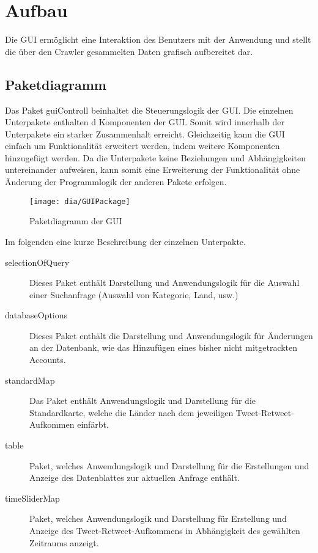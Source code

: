 \section{Aufbau}
Die GUI ermöglicht eine Interaktion des Benutzers mit der Anwendung und stellt die über den Crawler gesammelten Daten grafisch aufbereitet dar.\\
\subsection{Paketdiagramm}
Das Paket {guiControll} beinhaltet die Steuerungslogik der GUI. Die einzelnen Unterpakete enthalten d Komponenten der GUI. Somit wird innerhalb der Unterpakete ein starker Zusammenhalt erreicht. Gleichzeitig kann die GUI einfach um Funktionalität erweitert werden, indem weitere Komponenten hinzugefügt werden. Da die Unterpakete keine Beziehungen und Abhängigkeiten untereinander aufweisen, kann somit eine Erweiterung der Funktionalität ohne Änderung der Programmlogik der anderen Pakete erfolgen. 
\begin{figure}[h!]
	\centering
	\texttt{[image: dia/GUIPackage]}
	\caption{Paketdiagramm der GUI}
	\label{fig:GUI}
\end{figure}


Im folgenden eine kurze Beschreibung der einzelnen Unterpakte.
\begin{description}
		\item [selectionOfQuery] Dieses Paket enthält Darstellung und Anwendungslogik für die Auswahl einer Suchanfrage (Auswahl von Kategorie, Land, usw.)
		\item[databaseOptions] Dieses Paket enthält die Darstellung und Anwendungslogik für Änderungen an der Datenbank, wie das Hinzufügen eines bisher nicht mitgetrackten Accounts.
		
		\item [standardMap] Das Paket enthält Anwendungslogik und Darstellung für die Standardkarte, welche die Länder nach dem jeweiligen Tweet-Retweet-Aufkommen einfärbt.
		\item [table] Paket, welches Anwendungslogik und Darstellung für die Erstellungen und Anzeige des Datenblattes zur aktuellen Anfrage enthält.
		\item [timeSliderMap] Paket, welches Anwendungslogik und Darstellung für Erstellung und Anzeige des Tweet-Retweet-Aufkommens in Abhängigkeit des gewählten Zeitraums anzeigt.
\end{description}

